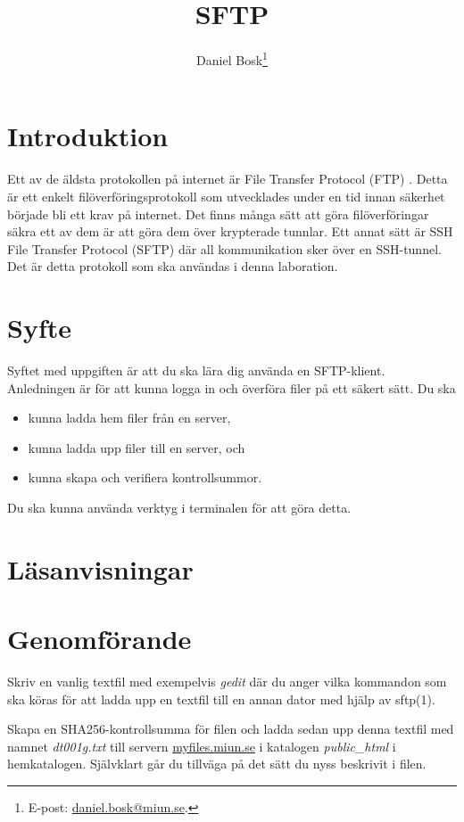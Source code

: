 \documentclass[a4paper]{miunasgn}
\title{SFTP}
\author{Daniel Bosk\footnote{%
	E-post: \href{mailto:daniel.bosk@miun.se}{daniel.bosk@miun.se}.
}}
\date{\svnId}
\begin{document}
\maketitle
\thispagestyle{foot}
\tableofcontents

\section{Introduktion}
\label{sec:Introduktion}
\noindent
Ett av de äldsta protokollen på internet är File Transfer Protocol (FTP) 
\citep{rfc959}.
Detta är ett enkelt filöverföringsprotokoll som utvecklades under en tid innan 
säkerhet började bli ett krav på internet.
Det finns många sätt att göra filöverföringar säkra ett av dem är att göra dem 
över krypterade tunnlar.
Ett annat sätt är SSH File Transfer Protocol (SFTP) där all kommunikation sker 
över en SSH-tunnel.
Det är detta protokoll som ska användas i denna laboration.


\section{Syfte}
\label{sec:Syfte}
\noindent
Syftet med uppgiften är att du ska lära dig använda en SFTP-klient.
Anledningen är för att kunna logga in och överföra filer på ett säkert sätt.
Du ska
\begin{itemize}
	\item kunna ladda hem filer från en server,
	\item kunna ladda upp filer till en server, och
	\item kunna skapa och verifiera kontrollsummor.
\end{itemize}
Du ska kunna använda verktyg i terminalen för att göra detta.


\section{Läsanvisningar}
\label{sec:Lasanvisningar}
\noindent



\section{Genomförande}
\label{sec:Genomforande}
\noindent
Skriv en vanlig textfil med exempelvis \emph{gedit} där du anger vilka 
kommandon som ska köras för att ladda upp en textfil till en annan dator med 
hjälp av sftp(1).

Skapa en SHA256-kontrollsumma för filen och ladda sedan upp denna textfil med 
namnet \emph{dt001g.txt} till servern \url{myfiles.miun.se} i katalogen 
\emph{public\_html} i hemkatalogen.
Självklart går du tillväga på det sätt du nyss beskrivit i filen.
\end{document}
